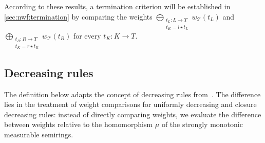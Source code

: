 According to these results, a termination criterion will be established in \autoref{sec:nwf:termination} by comparing the weights 
$\bigoplus_{\substack{t_L: L \rightarrow T\\ t_K = l \star t_L}}
        w_\mathcal{T}(t_L)$ and 
$\bigoplus_{\substack{t_R: R \rightarrow T\\ t_K = r \star t_R}} 
        w_\mathcal{T}(t_R)$ for every $t_K: K \rightarrow T$.

\subsection{Decreasing rules}
\label{sec:nwf:decreasing_rules}
The definition below adapts the concept of decreasing rules from~\cite{endrullis2024generalized_arxiv_v2}. The difference lies in the treatment of weight comparisons for uniformly decreasing and closure decreasing rules: instead of directly comparing weights, we evaluate the difference between weights relative to the homomorphism $\mu$ of the strongly monotonic measurable semirings.

